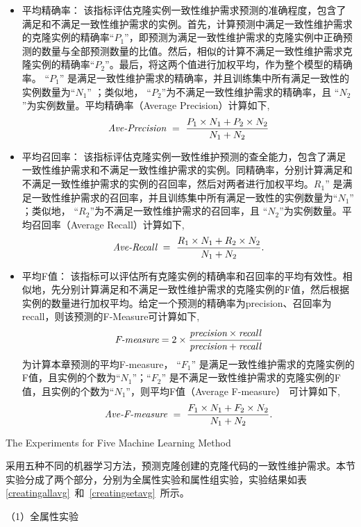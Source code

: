 \begin{itemize}
\item
平均精确率：
 该指标评估克隆实例一致性维护需求预测的准确程度，包含了满足和不满足一致性维护需求的实例。首先，计算预测中满足一致性维护需求的克隆实例的精确率``$P_1$''，即预测为满足一致性维护需求的克隆实例中正确预测的数量与全部预测数量的比值。然后，相似的计算不满足一致性维护需求克隆实例的精确率``$P_2$''。最后，将这两个值进行加权平均，作为整个模型的精确率。 ``$P_1$'' 是满足一致性维护需求的精确率，并且训练集中所有满足一致性的实例数量为``$N_1$'' ；类似地， ``$P_2$''为不满足一致性维护需求的精确率，且 ``$N_2$''为实例数量。平均精确率（Average Precision）计算如下,
\[
\mbox{\it Ave-Precision} ~=~ {\frac {P_1 \times N_1 + P_2 \times N_2}{N_1 + N_2}}
\]

\item
平均召回率：
该指标评估克隆实例一致性维护预测的查全能力，包含了满足一致性维护需求和不满足一致性维护需求的实例。同精确率，分别计算满足和不满足一致性维护需求的实例的召回率，然后对两者进行加权平均。$R_1$'' 是满足一致性维护需求的召回率，并且训练集中所有满足一致性的实例数量为``$N_1$'' ；类似地， ``$R_2$''为不满足一致性维护需求的召回率，且 ``$N_2$''为实例数量。平均召回率（Average Recall）计算如下,
\[
\mbox{\it Ave-Recall} ~=~ {\frac  {R_1 \times N_1 + R_2 \times N_2}{N_1 + N_2}}.
\]

\item
平均F值：
该指标可以评估所有克隆实例的精确率和召回率的平均有效性。相似地，先分别计算满足和不满足一致性维护需求的克隆实例的F值，然后根据实例的数量进行加权平均。给定一个预测的精确率为precision、召回率为 recall，则该预测的F-Measure可计算如下,
\[  
\mbox{\it F-measure} =2 \times {\frac {\mbox{\it precision} \times \mbox{\it recall} }{ \mbox{\it precision} + \mbox{\it recall} } }
\]
为计算本章预测的平均F-measure， ``$F_1$'' 是满足一致性维护需求的克隆实例的F值，且实例的个数为``$N_1$''；``$F_2$'' 是不满足一致性维护需求的克隆实例的F值，且实例的个数为``$N_1$''，则平均F值（Average F-measure） 可计算如下,
\[
\mbox{\it Ave-F-measure} ~=~ {\frac  {F_1 \times N_1 + F_2 \times N_2}{N_1 + N_2}}.
\]
\end{itemize}

{The Experiments for Five Machine Learning Method}

采用五种不同的机器学习方法，预测克隆创建的克隆代码的一致性维护需求。本节实验分成了两个部分，分别为全属性实验和属性组实验，实验结果如表\ref{creatingallavg}~和~\ref{creatingsetavg}~所示。

（1）全属性实验

